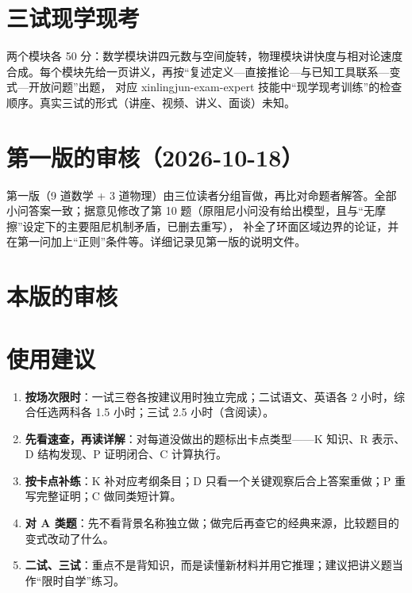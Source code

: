 \documentclass[cjk=noto, nomargin]{mojing-notes}
\begin{document}
\section{三试现学现考}

两个模块各 50 分：数学模块讲四元数与空间旋转，物理模块讲快度与相对论速度合成。每个模块先给一页讲义，再按“复述定义—直接推论—与已知工具联系—变式—开放问题”出题，
对应 xinlingjun-exam-expert 技能中“现学现考训练”的检查顺序。真实三试的形式（讲座、视频、讲义、面谈）未知。


\section{第一版的审核（2026-10-18）}

第一版（9 道数学 + 3 道物理）由三位读者分组盲做，再比对命题者解答。全部小问答案一致；据意见修改了第 10 题（原阻尼小问没有给出模型，且与“无摩擦”设定下的主要阻尼机制矛盾，已删去重写），
补全了环面区域边界的论证，并在第一问加上“正则”条件等。详细记录见第一版的说明文件。

\section{本版的审核}



\section{使用建议}

\begin{enumerate}
  \item \textbf{按场次限时}：一试三卷各按建议用时独立完成；二试语文、英语各 2 小时，综合任选两科各 1.5 小时；三试 2.5 小时（含阅读）。
  \item \textbf{先看速查，再读详解}：对每道没做出的题标出卡点类型——K 知识、R 表示、D 结构发现、P 证明闭合、C 计算执行。
  \item \textbf{按卡点补练}：K 补对应考纲条目；D 只看一个关键观察后合上答案重做；P 重写完整证明；C 做同类短计算。
  \item \textbf{对 A 类题}：先不看背景名称独立做；做完后再查它的经典来源，比较题目的变式改动了什么。
  \item \textbf{二试、三试}：重点不是背知识，而是读懂新材料并用它推理；建议把讲义题当作“限时自学”练习。
\end{enumerate}
\end{document}
